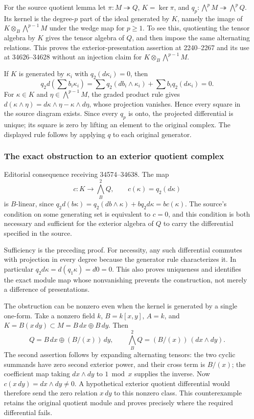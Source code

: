 For the source quotient lemma let \(\pi:M\twoheadrightarrow Q\), \(K=\ker\pi\), and \(q_p:\bigwedge^pM\twoheadrightarrow\bigwedge^pQ\). Its kernel is the degree-\(p\) part of the ideal generated by \(K\), namely the image of \(K\otimes_B\bigwedge^{p-1}M\) under the wedge map for \(p\ge1\). To see this, quotienting the tensor algebra by \(K\) gives the tensor algebra of \(Q\), and then impose the same alternating relations. This proves the exterior-presentation assertion at 2240--2267 and its use at 34626--34628 without an injection claim for \(K\otimes_B\bigwedge^{p-1}M\).

If \(K\) is generated by \(\kappa_i\) with \(q_2(d\kappa_i)=0\), then \[
q_2d\left(\sum b_i\kappa_i\right)
=\sum q_2(db_i\wedge\kappa_i)+\sum b_iq_2(d\kappa_i)=0.
\] For \(\kappa\in K\) and \(\eta\in\bigwedge^{p-1}M\), the graded product rule gives \(d(\kappa\wedge\eta)=d\kappa\wedge\eta-\kappa\wedge d\eta\), whose projection vanishes. Hence every square in the source diagram exists. Since every \(q_p\) is onto, the projected differential is unique; its square is zero by lifting an element to the original complex. The displayed rule follows by applying \(q\) to each original generator.

\subsubsection{The exact obstruction to an exterior quotient complex}\label{algebra-proof-042-the-exact-obstruction-to-an-exterior-quotient-complex}

Editorial consequence receiving 34574--34638. The map \[
c:K\longrightarrow\bigwedge_B^2Q,\qquad c(\kappa)=q_2(d\kappa)
\] is \(B\)-linear, since \(q_2d(b\kappa)=q_2(db\wedge\kappa)+bq_2d\kappa=bc(\kappa)\). The source's condition on some generating set is equivalent to \(c=0\), and this condition is both necessary and sufficient for the exterior algebra of \(Q\) to carry the differential specified in the source.

Sufficiency is the preceding proof. For necessity, any such differential commutes with projection in every degree because the generator rule characterizes it. In particular \(q_2d\kappa=d(q_1\kappa)=d0=0\). This also proves uniqueness and identifies the exact module map whose nonvanishing prevents the construction, not merely a difference of presentations.

The obstruction can be nonzero even when the kernel is generated by a single one-form. Take a nonzero field \(k\), \(B=k[x,y]\), \(A=k\), and \(K=B(x\,dy)\subset M=B\,dx\oplus B\,dy\). Then \[
Q=B\,dx\oplus(B/(x))\,dy,
\qquad\bigwedge^2_BQ=(B/(x))\,(dx\wedge dy).
\] The second assertion follows by expanding alternating tensors: the two cyclic summands have zero second exterior power, and their cross term is \(B/(x)\); the coefficient map taking \(dx\wedge dy\) to \(1\bmod x\) supplies the inverse. Now \(c(x\,dy)=dx\wedge dy\ne0\). A hypothetical exterior quotient differential would therefore send the zero relation \(x\,dy\) to this nonzero class. This counterexample retains the original quotient module and proves precisely where the required differential fails.

